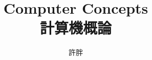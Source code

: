 \documentclass[12pt,a4paper,oneside]{book}
\begin{document}
\begin{CJK}{UTF8}{bkai}



\title{Computer Concepts\\計算機概論}
\author{許胖}
\maketitle
\tableofcontents



\clearpage
\end{CJK}
\end{document}
